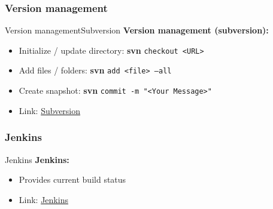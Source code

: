\subsubsection{Version management}
\begin{frame}{Version management}{Subversion}
  \textbf{Version management (subversion):}
  \begin{itemize}
    \item
      Initialize / update directory: \textbf{svn} \texttt{checkout <URL>}
    \item
      Add files / folders: \textbf{svn} \texttt{add <file> --all}
    \item
      Create snapshot: \textbf{svn} \texttt{commit -m "<Your Message>"}
    \item
      Link: {\color{Mittel-Blau}\href{\LectureSubversionLink}{Subversion}}
  \end{itemize}
\end{frame}


\subsubsection{Jenkins}
\begin{frame}{Jenkins}
  \textbf{Jenkins:}
  \begin{itemize}
    \item
      Provides current build status
    \item
      Link: {\color{Mittel-Blau}\href{\LectureJenkinsLink}{Jenkins}}
  \end{itemize}
\end{frame}